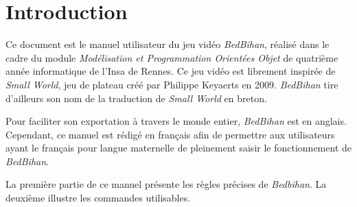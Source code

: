 \section*{Introduction}
	
	Ce document est le manuel utilisateur du jeu vidéo \emph{BedBihan}, réalisé dans le cadre du module \emph{Modélisation et Programmation Orientées Objet} de quatrième année informatique de l'{\sc Insa} de Rennes. Ce jeu vidéo est librement inspirée de \emph{Small World}, jeu de plateau créé par Philippe Keyaerts en 2009. \emph{BedBihan} tire d'ailleurs son nom de la traduction de \emph{Small World} en breton.
	
	Pour faciliter son exportation à travers le monde entier, \emph{BedBihan} est en anglais. Cependant, ce manuel est rédigé en français afin de permettre aux utilisateurs ayant le français pour langue maternelle de pleinement saisir le fonctionnement de \emph{BedBihan}.

	La première partie de ce manuel présente les règles précises de \emph{Bedbihan}. La deuxième illustre les commandes utilisables. 
	
	






	












